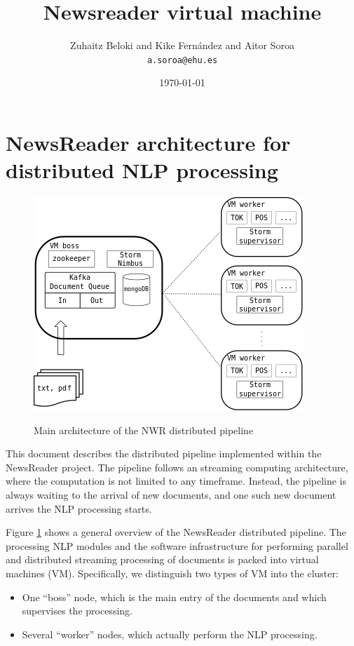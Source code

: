 \documentclass[a4]{article}
\author{Zuhaitz Beloki and  Kike Fernández and Aitor Soroa\\\texttt{a.soroa@ehu.es}}
\date{\today}
\title{Newsreader virtual machine}
\begin{document}
\maketitle
\tableofcontents
\cleardoublepage


\section{NewsReader architecture for distributed NLP processing}
\label{sec:newsr-arch-distr}

\begin{figure}[t]
  \centering
  {\includegraphics[scale=0.5]{lpstageVM14a.png}}  
  \caption{Main architecture of the NWR distributed pipeline}
  \label{fig:main-arch-nwr}
\end{figure}

This document describes the distributed pipeline implemented within the
NewsReader project. The pipeline follows an streaming computing
architecture, where the computation is not limited to any
timeframe. Instead, the pipeline is always waiting to the arrival of new
documents, and one such new document arrives the NLP processing starts.

Figure \ref{fig:main-arch-nwr} shows a general overview of the NewsReader
distributed pipeline. The processing NLP modules and the software
infrastructure for performing parallel and distributed streaming processing
of documents is packed into virtual machines (VM). Specifically, we
distinguish two types of VM into the cluster:
\begin{itemize}
\item One ``boss'' node, which is the main entry of the documents and which
  supervises the processing.
\item Several ``worker'' nodes, which actually perform the NLP processing.
\end{itemize}
\end{document}
